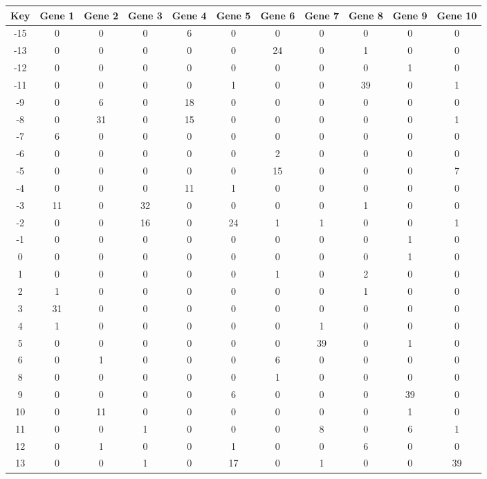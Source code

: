 \begin{tabular}{|c|c|c|c|c|c|c|c|c|c|c|}
\hline
Key & Gene 1 & Gene 2 & Gene 3 & Gene 4 & Gene 5 & Gene 6 & Gene 7 & Gene 8 & Gene 9 & Gene 10 \\
\hline
-15 & 0 & 0 & 0 & 6 & 0 & 0 & 0 & 0 & 0 & 0 \\
-13 & 0 & 0 & 0 & 0 & 0 & 24 & 0 & 1 & 0 & 0 \\
-12 & 0 & 0 & 0 & 0 & 0 & 0 & 0 & 0 & 1 & 0 \\
-11 & 0 & 0 & 0 & 0 & 1 & 0 & 0 & 39 & 0 & 1 \\
-9 & 0 & 6 & 0 & 18 & 0 & 0 & 0 & 0 & 0 & 0 \\
-8 & 0 & 31 & 0 & 15 & 0 & 0 & 0 & 0 & 0 & 1 \\
-7 & 6 & 0 & 0 & 0 & 0 & 0 & 0 & 0 & 0 & 0 \\
-6 & 0 & 0 & 0 & 0 & 0 & 2 & 0 & 0 & 0 & 0 \\
-5 & 0 & 0 & 0 & 0 & 0 & 15 & 0 & 0 & 0 & 7 \\
-4 & 0 & 0 & 0 & 11 & 1 & 0 & 0 & 0 & 0 & 0 \\
-3 & 11 & 0 & 32 & 0 & 0 & 0 & 0 & 1 & 0 & 0 \\
-2 & 0 & 0 & 16 & 0 & 24 & 1 & 1 & 0 & 0 & 1 \\
-1 & 0 & 0 & 0 & 0 & 0 & 0 & 0 & 0 & 1 & 0 \\
0 & 0 & 0 & 0 & 0 & 0 & 0 & 0 & 0 & 1 & 0 \\
1 & 0 & 0 & 0 & 0 & 0 & 1 & 0 & 2 & 0 & 0 \\
2 & 1 & 0 & 0 & 0 & 0 & 0 & 0 & 1 & 0 & 0 \\
3 & 31 & 0 & 0 & 0 & 0 & 0 & 0 & 0 & 0 & 0 \\
4 & 1 & 0 & 0 & 0 & 0 & 0 & 1 & 0 & 0 & 0 \\
5 & 0 & 0 & 0 & 0 & 0 & 0 & 39 & 0 & 1 & 0 \\
6 & 0 & 1 & 0 & 0 & 0 & 6 & 0 & 0 & 0 & 0 \\
8 & 0 & 0 & 0 & 0 & 0 & 1 & 0 & 0 & 0 & 0 \\
9 & 0 & 0 & 0 & 0 & 6 & 0 & 0 & 0 & 39 & 0 \\
10 & 0 & 11 & 0 & 0 & 0 & 0 & 0 & 0 & 1 & 0 \\
11 & 0 & 0 & 1 & 0 & 0 & 0 & 8 & 0 & 6 & 1 \\
12 & 0 & 1 & 0 & 0 & 1 & 0 & 0 & 6 & 0 & 0 \\
13 & 0 & 0 & 1 & 0 & 17 & 0 & 1 & 0 & 0 & 39 \\
\hline
\end{tabular}